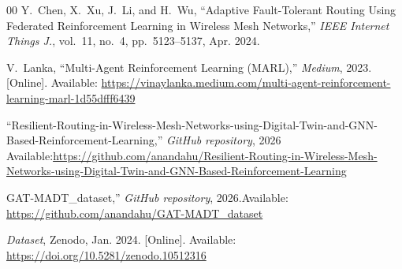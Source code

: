 \documentclass[conference]{IEEEtran}
\begin{document}
\begin{thebibliography}{00}
Y.~Chen, X.~Xu, J.~Li, and H.~Wu, ``Adaptive Fault-Tolerant Routing Using Federated Reinforcement Learning in Wireless Mesh Networks,'' \textit{IEEE Internet Things J.}, vol.~11, no.~4, pp.~5123--5137, Apr. 2024.

V.~Lanka, ``Multi-Agent Reinforcement Learning (MARL),'' \textit{Medium}, 2023. [Online]. Available: \url{https://vinaylanka.medium.com/multi-agent-reinforcement-learning-marl-1d55dfff6439}

``Resilient-Routing-in-Wireless-Mesh-Networks-using-Digital-Twin-and-GNN-Based-Reinforcement-Learning,'' \textit{GitHub repository}, 2026 Available:\url{https://github.com/anandahu/Resilient-Routing-in-Wireless-Mesh-Networks-using-Digital-Twin-and-GNN-Based-Reinforcement-Learning}

GAT-MADT\_dataset,'' \textit{GitHub repository}, 2026.Available: \url{https://github.com/anandahu/GAT-MADT_dataset}


\textit{Dataset}, Zenodo, Jan. 2024.
[Online]. Available: \url{https://doi.org/10.5281/zenodo.10512316}

\end{thebibliography}
\end{document}
